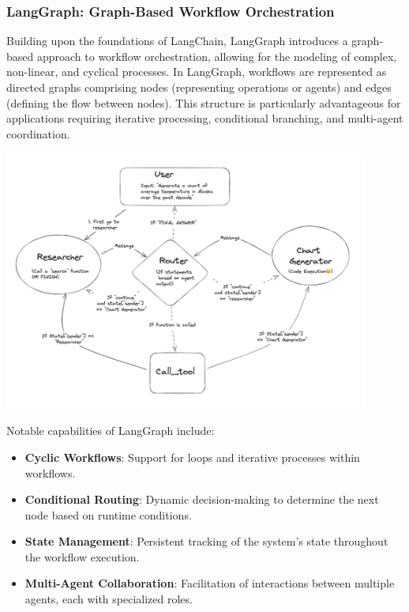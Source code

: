 \subsubsection{LangGraph: Graph-Based Workflow Orchestration}
Building upon the foundations of LangChain, LangGraph introduces a graph-based approach to workflow orchestration, allowing for the modeling of complex, non-linear, and cyclical processes. In LangGraph, workflows are represented as directed graphs comprising nodes (representing operations or agents) and edges (defining the flow between nodes). This structure is particularly advantageous for applications requiring iterative processing, conditional branching, and multi-agent coordination.

\begin{center}
    \centering
    \includegraphics[width=0.9\textwidth]{Images/langgraph_mutil_agent.png}
     \cite{langgraphMultiAgent}
    \label{fig:langgraph_multi_agent}
\end{center}

Notable capabilities of LangGraph include:
\begin{itemize}
    \item \textbf{Cyclic Workflows}: Support for loops and iterative processes within workflows.
    \item \textbf{Conditional Routing}: Dynamic decision-making to determine the next node based on runtime conditions.
    \item \textbf{State Management}: Persistent tracking of the system’s state throughout the workflow execution.
    \item \textbf{Multi-Agent Collaboration}: Facilitation of interactions between multiple agents, each with specialized roles.
\end{itemize}


